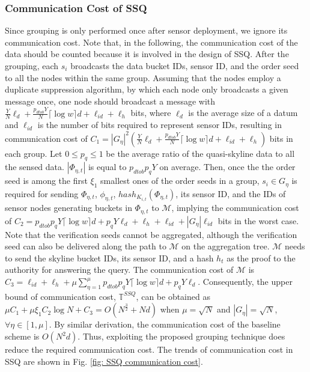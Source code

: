 \documentclass[conference]{IEEEtran}
\begin{document}
\subsubsection{Communication Cost of SSQ}
Since grouping is only performed once after sensor deployment, we ignore its communication cost. Note that, in the following, the communication cost of the data should be counted because it is involved in the design of SSQ. After the grouping, each $s_i$ broadcasts the data bucket IDs, sensor ID, and the order seed to all the nodes within the same group. Assuming that the nodes employ a duplicate suppression algorithm, by which each node only broadcasts a given message once, one node should broadcast a message with $\frac{Y}{N}\ell_d+\frac{p_{dtob}Y}{N}\lceil\log w\rceil d+\ell_{id}+\ell_h$ bits, where $\ell_d$ is the average size of a datum and $\ell_{id}$ is the number of bits required to represent sensor IDs, resulting in communication cost of $C_1=|G_\eta|^2(\frac{Y}{N}\ell_d+\frac{p_{dtob}Y}{N}\lceil\log w\rceil d+\ell_{id}+\ell_h)$ bits in each group. Let $0\leq p_q\leq 1$ be the average ratio of the quasi-skyline data to all the sensed data. $|\Phi_{\eta,t}|$ is equal to $p_{dtob}p_qY$ on average. Then, once the the order seed is among the first $\xi_1$ smallest ones of the order seeds in a group, $s_i\in G_\eta$ is required for sending $\Phi_{\eta,t}$, $\phi_{\eta,t}$, $hash_{K_{i,t}}(\Phi_{\eta,t})$, its sensor ID, and the IDs of sensor nodes generating buckets in $\Phi_{\eta,t}$ to $\mathcal{M}$, implying the communication cost of $C_2=p_{dtob}p_qY\lceil\log w\rceil d+p_qY\ell_{d}+\ell_h+\ell_{id}+|G_{\eta}|\ell_{id}$ bits in the worst case. Note that the verification seeds cannot be aggregated, although the verification seed can also be delivered along the path to $\mathcal{M}$ on the aggregation tree. $\mathcal{M}$ needs to send the skyline bucket IDs, its sensor ID, and a hash $h_t$ as the proof to the authority for answering the query. The communication cost of $\mathcal{M}$ is $C_3=\ell_{id}+\ell_h+\mu\sum_{\eta=1}^{\mu}p_{dtob}p_qY\lceil\log w\rceil d+p_qY\ell_d$. Consequently, the upper bound of communication cost, $\mathbb{T}^{SSQ}$, can be obtained as $\mu C_1+\mu\xi_1C_2\log N+C_3=O(N^{\frac{3}{2}}+Nd)$ when $\mu=\sqrt{N}$ and $|G_\eta|=\sqrt{N}$, $\forall\eta\in[1,\mu]$. By similar derivation, the communication cost of the baseline scheme is $O(N^2d)$. Thus, exploiting the proposed grouping technique does reduce the required communication cost. The trends of communication cost in SSQ are shown in Fig. \ref{fig: SSQ communication cost}.
\end{document}
